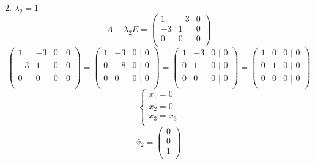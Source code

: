\documentclass{article}
\begin{document}
    2. $\lambda_2 = 1$
    \begin{equation*}
    A -\lambda_2 E = 
        \begin{pmatrix}
            1& -3& 0 \\
            -3& 1& 0 \\
            0& 0& 0  \\
        \end{pmatrix}
    \end{equation*}
    \begin{equation*}
        \begin{pmatrix}
            1& -3& 0 \text{ |  0}\\
            -3& 1& 0 \text{ |  0}\\
            0& 0& 0  \text{ |  0}\\
        \end{pmatrix}
         =
         \begin{pmatrix}
            1& -3& 0 \text{ |  0}\\
            0& -8& 0 \text{ |  0}\\
            0& 0& 0 \text{ |  0}\\
        \end{pmatrix}
        =
        \begin{pmatrix}
            1& -3& 0 \text{ |  0}\\
            0& 1& 0 \text{ |  0}\\
            0& 0& 0 \text{ |  0}\\
        \end{pmatrix}
        =
        \begin{pmatrix}
            1& 0& 0 \text{ |  0}\\
            0& 1& 0 \text{ |  0}\\
            0& 0& 0 \text{ |  0}\\
        \end{pmatrix}
    \end{equation*}
       \begin{equation*}
        \begin{cases}
            x_1= 0 \\
            x_2= 0 \\
            x_3 = x_3 \\
        \end{cases}
    \end{equation*}
    \begin{equation*}
    \widetilde{v_2} = 
        \begin{pmatrix}
            0\\
            0 \\
            1  \\
        \end{pmatrix}
    \end{equation*}
\end{document}
